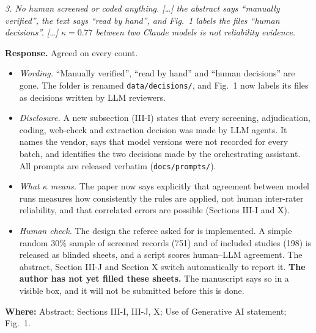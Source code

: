 \documentclass[10pt,a4paper]{article}
\newenvironment{referee}{\par\medskip\noindent\begin{minipage}{\linewidth}\color{black!65}\itshape}{\end{minipage}\par\smallskip}
\newcommand{\resp}{\noindent\textbf{Response.} }
\newcommand{\where}[1]{\par\noindent\textbf{Where:} #1\par}
\begin{document}
\begin{referee}
3. No human screened or coded anything. [\ldots] the abstract says ``manually verified'', the text says ``read by hand'', and Fig.~1 labels the files ``human decisions''. [\ldots] $\kappa=0.77$ between two Claude models is not reliability evidence.
\end{referee}
\resp Agreed on every count.
\begin{itemize}
  \item \emph{Wording.} ``Manually verified'', ``read by hand'' and ``human decisions'' are gone. The folder is renamed \texttt{data/decisions/}, and Fig.~1 now labels its files as decisions written by LLM reviewers.
  \item \emph{Disclosure.} A new subsection (III-I) states that every screening, adjudication, coding, web-check and extraction decision was made by LLM agents. It names the vendor, says that model versions were not recorded for every batch, and identifies the two decisions made by the orchestrating assistant. All prompts are released verbatim (\texttt{docs/prompts/}).
  \item \emph{What $\kappa$ means.} The paper now says explicitly that agreement between model runs measures how consistently the rules are applied, not human inter-rater reliability, and that correlated errors are possible (Sections III-I and X).
  \item \emph{Human check.} The design the referee asked for is implemented. A simple random 30\% sample of screened records (751) and of included studies (198) is released as blinded sheets, and a script scores human--LLM agreement. The abstract, Section III-J and Section X switch automatically to report it. \textbf{The author has not yet filled these sheets.} The manuscript says so in a visible box, and it will not be submitted before this is done.
\end{itemize}
\where{Abstract; Sections III-I, III-J, X; Use of Generative AI statement; Fig.~1.}
\end{document}
